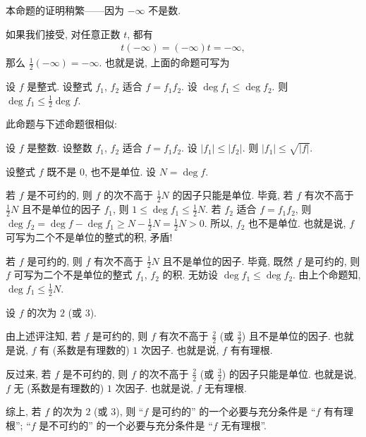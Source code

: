 \begin{remark}
    本命题的证明稍繁——因为 $-\infty$ 不是数.
\end{remark}

如果我们接受, 对任意正数 $t$, 都有
\begin{align*}
    t (-\infty) = (-\infty) t = -\infty,
\end{align*}
那么 $\frac{1}{2} (-\infty) = -\infty$. 也就是说, 上面的命题可写为
\begin{proposition}
    设 $f$ 是整式. 设整式 $f_1$, $f_2$ 适合 $f = f_1 f_2$. 设 $\deg f_1 \leq \deg f_2$. 则 $\deg f_1 \leq \frac{1}{2} \deg f$.
\end{proposition}

\begin{remark}
    此命题与下述命题很相似:

    设 $f$ 是整数. 设整数 $f_1$, $f_2$ 适合 $f = f_1 f_2$. 设 $|f_1| \leq |f_2|$. 则 $|f_1| \leq \sqrt{|f|}$.
\end{remark}

\begin{remark}
    设整式 $f$ 既不是 $0$, 也不是单位. 设 $N = \deg f$.

    若 $f$ 是不可约的, 则 $f$ 的次不高于 $\frac{1}{2} N$ 的因子只能是单位. 毕竟, 若 $f$ 有次不高于 $\frac{1}{2} N$ 且不是单位的因子 $f_1$, 则 $1 \leq \deg f_1 \leq \frac{1}{2} N$. 若 $f_2$ 适合 $f = f_1 f_2$, 则 $\deg f_2 = \deg f - \deg f_1 \geq N - \frac{1}{2} N = \frac{1}{2} N > 0$. 所以, $f_2$ 也不是单位. 也就是说, $f$ 可写为二个不是单位的整式的积, 矛盾!

    若 $f$ 是可约的, 则 $f$ 有次不高于 $\frac{1}{2} N$ 且不是单位的因子. 毕竟, 既然 $f$ 是可约的, 则 $f$ 可写为二个不是单位的整式 $f_1$, $f_2$ 的积. 无妨设 $\deg f_1 \leq \deg f_2$. 由上个命题知, $\deg f_1 \leq \frac{1}{2} N$.
\end{remark}

\begin{remark}
    设 $f$ 的次为 $2$ (或 $3$).

    由上述评注知, 若 $f$ 是可约的, 则 $f$ 有次不高于 $\frac{2}{2}$ (或 $\frac{3}{2}$) 且不是单位的因子. 也就是说, $f$ 有 (系数是有理数的) $1$ 次因子. 也就是说, $f$ 有有理根.

    反过来, 若 $f$ 是不可约的, 则 $f$ 的次不高于 $\frac{2}{2}$ (或 $\frac{3}{2}$) 的因子只能是单位. 也就是说, $f$ 无 (系数是有理数的) $1$ 次因子. 也就是说, $f$ 无有理根.

    综上, 若 $f$ 的次为 $2$ (或 $3$), 则 ``$f$ 是可约的'' 的一个必要与充分条件是 ``$f$ 有有理根''; ``$f$ 是不可约的'' 的一个必要与充分条件是 ``$f$ 无有理根''.
\end{remark}

